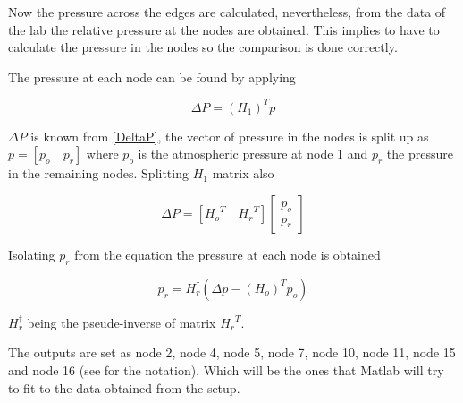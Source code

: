 Now the pressure across the edges are calculated, nevertheless, from the data of the lab the relative pressure at the nodes are obtained. This implies to 
have to calculate the pressure in the nodes so the comparison is done correctly. 

The pressure at each node can be found by applying 

\begin{equation}
  \Delta P = (H_1)^T p
\end{equation}

$\Delta P$ is known from \eqref{DeltaP}, the vector of pressure in the nodes is split up as $p = [p_o \quad p_r]$ where $p_o$ is the atmospheric pressure at 
node 1 and $p_r$ the pressure in the remaining nodes. Splitting $H_1$ matrix also

\begin{equation}
  \Delta P = [{H_o}^{T} \quad {H_r}^{T}] 
  \begin{bmatrix}
    p_o \\
    p_r
  \end{bmatrix}
\end{equation}

Isolating $p_r$ from the equation the pressure at each node is obtained

\begin{equation}
  p_r = H_r^{\dagger} (\Delta p - (H_o)^{T} p_o)
\end{equation}

$H_r^{\dagger}$ being the pseude-inverse of matrix ${H_r}^{T}$.

The outputs are set as node 2, node 4, node 5, node 7, node 10, node 11, node 15 and node 16 (see  for the notation). Which will be the ones that Matlab will try to fit 
to the data obtained from the setup. 


% 